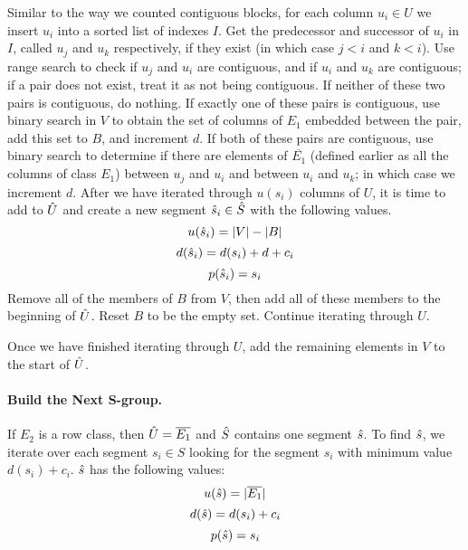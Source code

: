 Similar to the way we counted contiguous blocks, for each column $u_i \in U$ we insert $u_i$ into a sorted list of indexes $I$.
Get the predecessor and successor of $u_i$ in $I$, called $u_j$ and $u_k$
respectively, if they exist (in which case $j < i$ and $k < i$).
Use range search to check if $u_j$ and $u_i$ are contiguous,
and if $u_i$ and $u_k$ are contiguous; if a pair does not exist,
treat it as not being contiguous.
If neither of these two pairs is contiguous, do nothing.
If exactly one of these pairs is contiguous, use binary search in $V$
to obtain the set of columns of $E_1$ embedded between the pair,
add this set to $B$, and increment $d$.
If both of these pairs are contiguous, use binary search to determine
if there are elements of $\overline{E_1}$
(defined earlier as all the columns of class $E_1$)
 between $u_j$ and $u_i$ and between
$u_i$ and $u_k$; in which case we increment $d$.
After we have iterated through $u(s_i)$ columns of $U$, it is time to add to
$\hat{U}$ and create a new segment $\hat{s}_i \in \hat{S}$ with the following values.
$$u(\hat{s}_i) = |V| - |B|$$
$$d(\hat{s}_i) = d(s_i) + d + c_i$$
$$p(\hat{s}_i) = s_i$$ %
Remove all of the members of $B$ from $V$,
 then add all of these members to the beginning of $\hat{U}$.
Reset $B$ to be the empty set.
Continue iterating through $U$.

Once we have finished iterating through $U$, add the remaining elements in $V$ to the start of $\hat{U}$.

\paragraph{Build the Next S-group.}
If $E_2$ is a row class, then $\hat{U} = \overline{E_1}$
 and $\hat{S}$ contains one segment $\hat{s}$.
To find $\hat{s}$, we iterate over each segment $s_i \in S$
looking for the segment $s_i$ with minimum value $d(s_i) + c_i$.
$\hat{s}$ has the following values:
$$u(\hat{s}) = |\overline{E_1}|$$
$$d(\hat{s}) = d(s_i) + c_i$$ %
$$p(\hat{s}) = s_i$$ %

